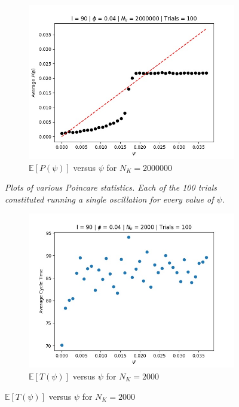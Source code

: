 \documentclass[letterpaper,12pt]{article}
\numberwithin{table}{section}
\numberwithin{figure}{section}
\numberwithin{equation}{section}
\newcommand*{\ev}[1]{\mathbb{E}\left[#1\right]}
\newcommand{\ccaption}[1]{\caption{\textit{#1}}}
\begin{document}
\begin{flushleft}
\begin{figure}[!h]
        \begin{subfigure}{0.72\textwidth}
            \includegraphics[width=\linewidth]{img/pmap-nk2000000.jpg}
            \caption{$\ev{P(\psi)}$ versus $\psi$ for $N_K = 2000000$}
        \end{subfigure}
        
        \captionsetup{width=0.8\linewidth}
        \ccaption{Plots of various Poincare statistics. Each of the 100 trials constituted running a single oscillation for every value of $\psi$.}

    \end{figure}
    \begin{figure}[!h]\ContinuedFloat

        \centering

        \begin{subfigure}{0.72\textwidth}
            \includegraphics[width=\linewidth]{img/pt-nk2000.jpg}
            \caption{$\ev{T(\psi)}$ versus $\psi$ for $N_K = 2000$}
        \end{subfigure}
    

\end{figure}
\end{flushleft}
\end{document}
